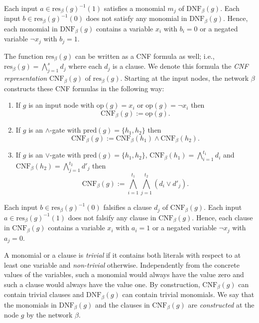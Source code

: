 \documentclass[11pt]{article}
\begin{document}
Each input $a \in \mbox{res}_{\beta}(g)^{-1}(1)$ satisfies a monomial $m_j$ of $\mbox{DNF}_{\beta}(g)$.
Each input $b \in \mbox{res}_{\beta}(g)^{-1}(0)$ does not satisfy any monomial in $\mbox{DNF}_{\beta}(g)$. Hence,
each monomial in $\mbox{DNF}_{\beta}(g)$ contains a variable $x_i$ with $b_i = 0$ or a negated variable $\neg x_j$
with $b_j = 1$.

The function $\mbox{res}_{\beta}(g)$ can be written as a CNF formula as well; i.e.,
$\mbox{res}_{\beta}(g) = \bigwedge_{j=1}^s d_j$ where each $d_j$ is a clause.
We denote this formula the {\em CNF representation\/} $\mbox{CNF}_{\beta}(g)$ of $\mbox{res}_{\beta}(g)$.
Starting at the input nodes, the network $\beta$ constructs these CNF formulas in the following way:
\begin{enumerate}
\item
  If $g$ is an input node with $\mbox{op}(g) = x_i$ or $\mbox{op}(g) = \neg x_i$ then 
  $$\mbox{CNF}_{\beta}(g) := \mbox{op}(g).$$
\item
  If $g$ is an $\wedge$-gate with $\mbox{pred}(g) = \{h_1,h_2\}$ then 
  $$\mbox{CNF}_{\beta}(g) := \mbox{CNF}_{\beta}(h_1) \wedge \mbox{CNF}_{\beta}(h_2).$$
\item
  If $g$ is an $\vee$-gate with $\mbox{pred}(g) = \{h_1,h_2\}$, $\mbox{CNF}_{\beta}(h_1) = \bigwedge_{i=1}^{t_1} d_i$
  and $\mbox{CNF}_{\beta}(h_2) = \bigwedge_{j=1}^{t_2} d'_j$ then
  $$\mbox{CNF}_{\beta}(g) := \bigwedge_{i=1}^{t_1}\bigwedge_{j=1}^{t_2} (d_i \vee d'_j).$$
\end{enumerate}

Each input $b \in \mbox{res}_{\beta}(g)^{-1}(0)$ falsifies a clause $d_j$ of $\mbox{CNF}_{\beta}(g)$.
Each input $a \in \mbox{res}_{\beta}(g)^{-1}(1)$ does not falsify any clause in $\mbox{CNF}_{\beta}(g)$. Hence, each
clause in $\mbox{CNF}_{\beta}(g)$ contains a variable $x_i$ with $a_i = 1$ or a negated variable $\neg x_j$ with
$a_j = 0$.

A monomial or a clause is {\em trivial\/} if it contains both literals with respect to at least one variable and
{\em non-trivial\/} otherwise. Independently from the concrete values of the variables, such a monomial would always
have the value zero and such a clause would always have the value one.
By construction, $\mbox{CNF}_{\beta}(g)$ can contain trivial clauses and $\mbox{DNF}_{\beta}(g)$ can contain trivial
monomials.
We say that the monomials in $\mbox{DNF}_{\beta}(g)$ and the clauses in $\mbox{CNF}_{\beta}(g)$ are {\em constructed\/}
at the node $g$ by the network $\beta$. 
\end{document}
